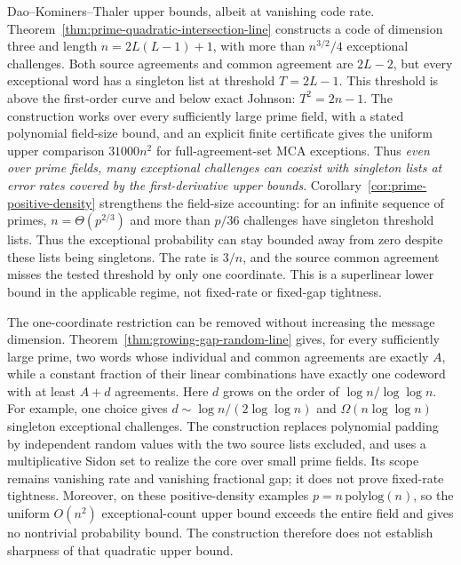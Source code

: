 \documentclass[11pt,letterpaper]{article}
\theoremstyle{definition}
\theoremstyle{remark}
\begin{document}
Dao--Kominers--Thaler upper bounds, albeit at vanishing code rate. Theorem~\ref{thm:prime-quadratic-intersection-line}
constructs a code of dimension three and length $n=2L(L-1)+1$,
with more than $n^{3/2}/4$ exceptional challenges. Both source agreements
and common agreement are $2L-2$, but every exceptional word has a
singleton list at threshold $T=2L-1$. This threshold is above the
first-order curve and below exact Johnson: $T^2=2n-1$.
The construction works over every sufficiently large prime field, with
a stated polynomial field-size bound, and an explicit finite certificate
gives the uniform upper comparison $31000n^2$ for full-agreement-set
MCA exceptions. Thus \emph{even over prime fields, many exceptional
challenges can coexist with singleton lists at error rates covered by
the first-derivative upper bounds}.
Corollary~\ref{cor:prime-positive-density} strengthens the field-size
accounting: for an infinite sequence of primes, $n=\Theta(p^{2/3})$
and more than $p/36$ challenges have singleton threshold lists. Thus the
exceptional probability can stay bounded away from zero despite these
lists being singletons.
The rate is $3/n$, and the source common agreement misses the tested
threshold by only one coordinate. This is a superlinear lower bound in
the applicable regime, not fixed-rate or fixed-gap tightness.

The one-coordinate restriction can be removed without increasing the
message dimension. Theorem~\ref{thm:growing-gap-random-line} gives, for
every sufficiently large prime, two words whose individual and common
agreements are exactly $A$, while a constant fraction of their linear
combinations have exactly one codeword with at least $A+d$ agreements.
Here $d$ grows on the order of $\log n/\log\log n$. For example, one
choice gives $d\sim\log n/(2\log\log n)$ and
$\Omega(n\log\log n)$ singleton exceptional challenges.
The construction replaces polynomial padding by independent random values
with the two source lists excluded, and uses a multiplicative Sidon set
to realize the core over small prime fields. Its scope remains vanishing
rate and vanishing fractional gap; it does not prove fixed-rate tightness.
Moreover, on these positive-density examples $p=n\,\mathrm{polylog}(n)$,
so the uniform $O(n^2)$ exceptional-count upper bound exceeds the entire
field and gives no nontrivial probability bound. The construction therefore
does not establish sharpness of that quadratic upper bound.
\end{document}
